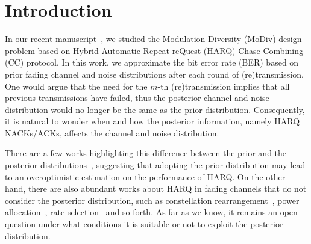 \documentclass[journal,draftcls,onecolumn,12pt,twoside]{IEEEtran}
\begin{document}
%
\IEEEpeerreviewmaketitle



\section{Introduction}
\label{sec:intro}
In our recent manuscript~\cite{wu2015modulation}, we studied the Modulation
Diversity (MoDiv) design problem based on Hybrid Automatic Repeat reQuest (HARQ)
Chase-Combining (CC) protocol. In this work, we approximate the bit
error rate (BER) based on prior fading channel and noise distributions after
each round of (re)transmission. One would argue that the need for the
$m$-th (re)transmission implies that all previous transmissions have failed,
thus the posterior channel and noise distribution would no longer be the same as
the prior distribution. Consequently, it is natural to wonder when and how the
posterior information, namely HARQ NACKs/ACKs, affects the channel and noise
distribution.

There are a few works highlighting this difference between the prior and
the posterior
distributions~\cite{gu2006modeling}\cite{long2012analysis}\cite{alkurd2015modeling},
suggesting that adopting the prior distribution may lead to an overoptimistic
estimation on the performance of HARQ.
On the other hand, there are also abundant works about HARQ in fading channels
that do not consider the posterior distribution, such as constellation
rearrangement~\cite{harvind2005symbol}, power
allocation~\cite{chaitanya2014adaptive}, rate selection~\cite{jin2011optimal}
and so forth. As far as we know, it remains an open question
under what conditions it is suitable or not to exploit the posterior distribution.
\end{document}
